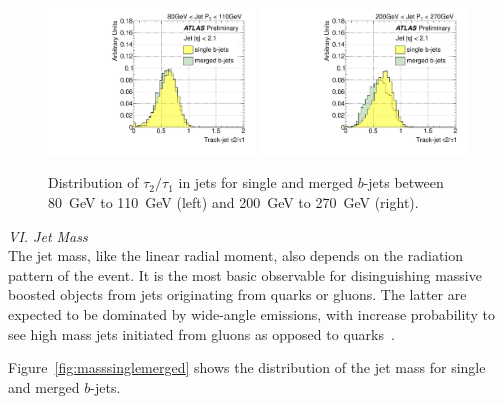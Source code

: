 \begin{figure}[tp]
\centering
\includegraphics[width=0.49\textwidth]{FIGS/VarsSingleMerged/TauRatio080.pdf}
\includegraphics[width=0.49\textwidth]{FIGS/VarsSingleMerged/TauRatio200.pdf}
\caption{Distribution of $\tau_2/\tau_1$ in jets for single and merged $b$-jets between 80~GeV to 110~GeV (left) and 200~GeV to 270~GeV (right).}
\label{fig:tauratiosinglemerged}
\end{figure}



{ \em VI. Jet Mass}
\\[3mm]

The jet mass, like the linear radial moment, also depends on the radiation pattern of the event. It is the most basic observable for disinguishing massive boosted objects from jets originating from quarks or gluons. The latter are expected to be dominated by wide-angle emissions, with increase probability to see high mass jets initiated from gluons as opposed to quarks~\cite{PhysRevD.79.074012}.  



Figure~\ref{fig:masssinglemerged} shows the distribution of the jet mass for single and merged $b$-jets.
\\[3mm]

